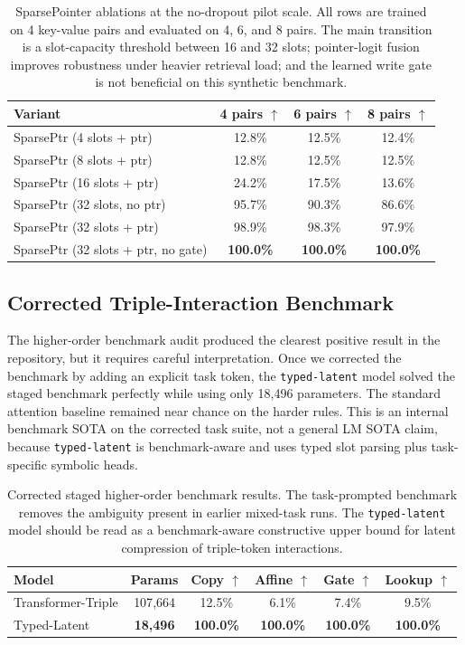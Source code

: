 \documentclass[11pt]{article}
\begin{document}
\begin{table}[t]
\centering
\small
\begin{tabular}{lccc}
\toprule
Variant & 4 pairs $\uparrow$ & 6 pairs $\uparrow$ & 8 pairs $\uparrow$ \\
\midrule
SparsePtr (4 slots + ptr) & 12.8\% & 12.5\% & 12.4\% \\
SparsePtr (8 slots + ptr) & 12.8\% & 12.5\% & 12.5\% \\
SparsePtr (16 slots + ptr) & 24.2\% & 17.5\% & 13.6\% \\
SparsePtr (32 slots, no ptr) & 95.7\% & 90.3\% & 86.6\% \\
SparsePtr (32 slots + ptr) & 98.9\% & 98.3\% & 97.9\% \\
SparsePtr (32 slots + ptr, no gate) & \textbf{100.0\%} & \textbf{100.0\%} & \textbf{100.0\%} \\
\bottomrule
\end{tabular}
\caption{SparsePointer ablations at the no-dropout pilot scale. All rows are
trained on 4 key-value pairs and evaluated on 4, 6, and 8 pairs. The main
transition is a slot-capacity threshold between 16 and 32 slots; pointer-logit
fusion improves robustness under heavier retrieval load; and the learned write
gate is not beneficial on this synthetic benchmark.}
\label{tab:sparsepointerablation}
\end{table}

\subsection{Corrected Triple-Interaction Benchmark}
The higher-order benchmark audit produced the clearest positive result in the
repository, but it requires careful interpretation. Once we corrected the
benchmark by adding an explicit task token, the \texttt{typed-latent} model
solved the staged benchmark perfectly while using only 18{,}496 parameters.
The standard attention baseline remained near chance on the harder rules. This
is an internal benchmark SOTA on the corrected task suite, not a general LM
SOTA claim, because \texttt{typed-latent} is benchmark-aware and uses typed
slot parsing plus task-specific symbolic heads.

\begin{table}[t]
\centering
\begin{tabular}{lccccc}
\toprule
Model & Params & Copy $\uparrow$ & Affine $\uparrow$ & Gate $\uparrow$ & Lookup $\uparrow$ \\
\midrule
Transformer-Triple & 107{,}664 & 12.5\% & 6.1\% & 7.4\% & 9.5\% \\
Typed-Latent & \textbf{18{,}496} & \textbf{100.0\%} & \textbf{100.0\%} & \textbf{100.0\%} & \textbf{100.0\%} \\
\bottomrule
\end{tabular}
\caption{Corrected staged higher-order benchmark results. The task-prompted
benchmark removes the ambiguity present in earlier mixed-task runs. The
\texttt{typed-latent} model should be read as a benchmark-aware constructive
upper bound for latent compression of triple-token interactions.}
\label{tab:triple}
\end{table}
\end{document}
